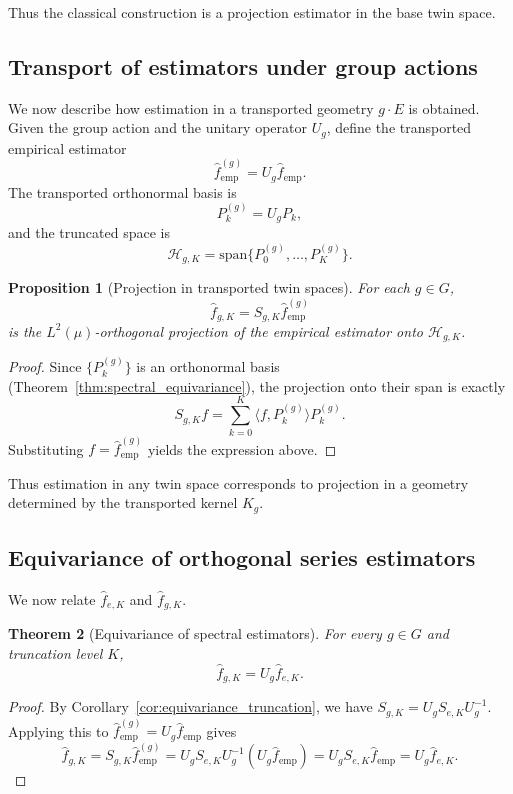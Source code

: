 \documentclass[11pt,a4paper]{article}
\newtheorem{theorem}{Theorem}[section]
\newtheorem{proposition}[theorem]{Proposition}
\newcommand{\RKHS}{\mathcal{H}}
\newcommand{\ip}[2]{\langle #1, #2 \rangle}
\begin{document}
Thus the classical construction is a projection estimator in the base twin space.

\subsection{Transport of estimators under group actions}

We now describe how estimation in a transported geometry $g \cdot E$ is obtained. Given the group action and the unitary operator $U_g$, define the transported empirical estimator
\[
\hat{f}_{\mathrm{emp}}^{(g)} = U_g \hat{f}_{\mathrm{emp}}.
\]
The transported orthonormal basis is
\[
P_k^{(g)} = U_g P_k,
\]
and the truncated space is
\[
\RKHS_{g,K} = \mathrm{span}\{P_0^{(g)}, \ldots, P_K^{(g)}\}.
\]

\begin{proposition}[Projection in transported twin spaces]\label{prop:projection_transported}
For each $g \in G$,
\[
\hat{f}_{g,K} = S_{g,K} \hat{f}_{\mathrm{emp}}^{(g)}
\]
is the $L^2(\mu)$-orthogonal projection of the empirical estimator onto $\RKHS_{g,K}$.
\end{proposition}

\begin{proof}
Since $\{P_k^{(g)}\}$ is an orthonormal basis (Theorem~\ref{thm:spectral_equivariance}), the projection onto their span is exactly
\[
S_{g,K} f = \sum_{k=0}^{K} \ip{f}{P_k^{(g)}} P_k^{(g)}.
\]
Substituting $f = \hat{f}_{\mathrm{emp}}^{(g)}$ yields the expression above.
\end{proof}

Thus estimation in any twin space corresponds to projection in a geometry determined by the transported kernel $K_g$.

\subsection{Equivariance of orthogonal series estimators}

We now relate $\hat{f}_{e,K}$ and $\hat{f}_{g,K}$.

\begin{theorem}[Equivariance of spectral estimators]\label{thm:equivariance_estimators}
For every $g \in G$ and truncation level $K$,
\[
\hat{f}_{g,K} = U_g \hat{f}_{e,K}.
\]
\end{theorem}

\begin{proof}
By Corollary~\ref{cor:equivariance_truncation}, we have $S_{g,K} = U_g S_{e,K} U_g^{-1}$. Applying this to $\hat{f}_{\mathrm{emp}}^{(g)} = U_g \hat{f}_{\mathrm{emp}}$ gives
\[
\hat{f}_{g,K} = S_{g,K} \hat{f}_{\mathrm{emp}}^{(g)} = U_g S_{e,K} U_g^{-1}(U_g \hat{f}_{\mathrm{emp}}) = U_g S_{e,K} \hat{f}_{\mathrm{emp}} = U_g \hat{f}_{e,K}.
\]
\end{proof}
\end{document}
